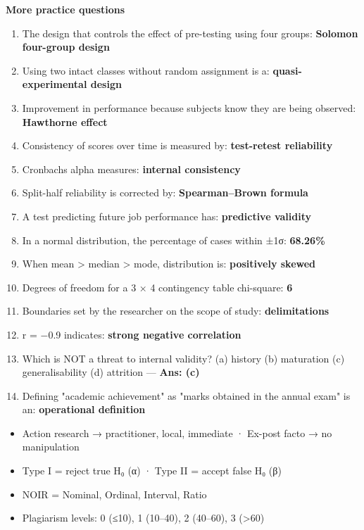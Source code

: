 \textbf{More practice questions}

\begin{enumerate}
\def\labelenumi{\arabic{enumi}.}
\setcounter{enumi}{25}
\tightlist
\item
  The design that controls the effect of pre-testing using four groups: \textbf{Solomon four-group design}
\item
  Using two intact classes without random assignment is a: \textbf{quasi-experimental design}
\item
  Improvement in performance because subjects know they are being observed: \textbf{Hawthorne effect}
\item
  Consistency of scores over time is measured by: \textbf{test-retest reliability}
\item
  Cronbach\textquotesingle s alpha measures: \textbf{internal consistency}
\item
  Split-half reliability is corrected by: \textbf{Spearman--Brown formula}
\item
  A test predicting future job performance has: \textbf{predictive validity}
\item
  In a normal distribution, the percentage of cases within ±1σ: \textbf{68.26\%}
\item
  When mean \textgreater{} median \textgreater{} mode, distribution is: \textbf{positively skewed}
\item
  Degrees of freedom for a 3 × 4 contingency table chi-square: \textbf{6}
\item
  Boundaries set by the researcher on the scope of study: \textbf{delimitations}
\item
  r = −0.9 indicates: \textbf{strong negative correlation}
\item
  Which is NOT a threat to internal validity? (a) history (b) maturation (c) generalisability (d) attrition --- \textbf{Ans: (c)}
\item
  Defining "academic achievement" as "marks obtained in the annual exam" is an: \textbf{operational definition}
\end{enumerate}

\begin{revbox}

\begin{itemize}
\tightlist
\item
  Action research → practitioner, local, immediate · Ex-post facto → no manipulation
\item
  Type I = reject true H₀ (α) · Type II = accept false H₀ (β)
\item
  NOIR = Nominal, Ordinal, Interval, Ratio
\item
  Plagiarism levels: 0 (≤10), 1 (10--40), 2 (40--60), 3 (\textgreater60)
\end{itemize}

\end{revbox}
